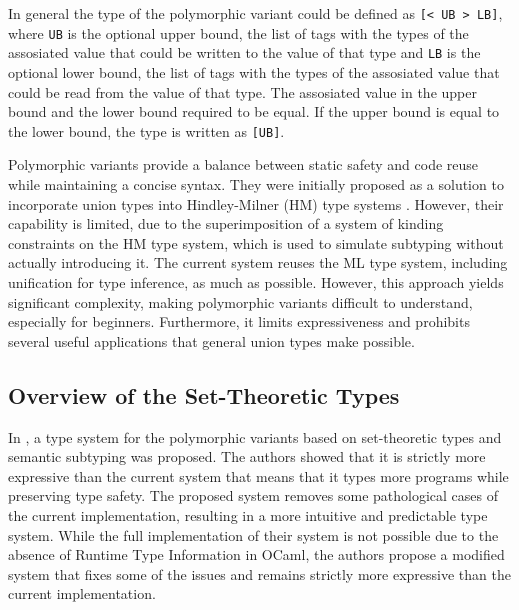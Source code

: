 \documentclass[a4paper,11pt,oneside]{article}
\theoremstyle{definition}
\begin{document}
In general the type of the polymorphic variant could be defined as \texttt{[< UB > LB]}, where \texttt{UB} is the optional upper bound, the list of tags with the types of the assosiated value that could be written to the value of that type and \texttt{LB} is the optional lower bound, the list of tags with the types of the assosiated value that could be read from the value of that type. The assosiated value in the upper bound and the lower bound required to be equal.
If the upper bound is equal to the lower bound, the type is written as \texttt{[UB]}.

Polymorphic variants provide a balance between static safety and code reuse while maintaining a concise syntax.
They were initially proposed as a solution to incorporate union types into Hindley-Milner (HM) type systems \cite{Garrigue_1998}.
However, their capability is limited, due to the superimposition of a system of kinding constraints on the HM type system, which is used to simulate subtyping without actually introducing it.
The current system reuses the ML type system, including unification for type inference, as much as possible.
However, this approach yields significant complexity, making polymorphic variants difficult to understand, especially for beginners.
Furthermore, it limits expressiveness and prohibits several useful applications that general union types make possible.

\subsection{Overview of the Set-Theoretic Types}

In \cite{Castagna_2016}, a type system for the polymorphic variants based on set-theoretic types and semantic subtyping was proposed.
The authors showed that it is strictly more expressive than the current system that means that it types more programs while preserving type safety.
The proposed system removes some pathological cases of the current implementation, resulting in a more intuitive and predictable type system.
While the full implementation of their system is not possible due to the absence of Runtime Type Information in OCaml, the authors propose a modified system that fixes some of the issues and remains strictly more expressive than the current implementation.
\end{document}
